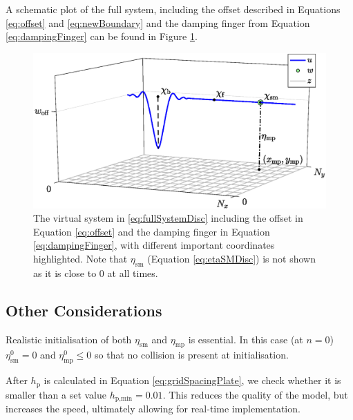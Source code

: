     A schematic plot of the full system, including the offset described in Equations \eqref{eq:offset} and \eqref{eq:newBoundary} and the damping finger from Equation \eqref{eq:dampingFinger} can be found in Figure \ref{fig:trombaSystem}.
    
    \begin{figure}[t]
      \centering
      \includegraphics[width=\paperFigWidth\textwidth]{figures/trombaSystem.eps}
      \caption{The virtual system in \eqref{eq:fullSystemDisc} including the offset in Equation \eqref{eq:offset} and the damping finger in Equation \eqref{eq:dampingFinger}, with different important coordinates highlighted. Note that $\eta_\text{sm}$ (Equation \eqref{eq:etaSMDisc}) is not shown as it is close to 0 at all times.}
      \label{fig:trombaSystem}
    \end{figure}
    
    
    \subsection{Other Considerations}
    Realistic initialisation of both $\eta_\text{sm}$ and $\eta_\text{mp}$ is essential. In this case (at $n=0$) $\eta_\text{sm}^0 = 0$ and $\eta_\text{mp}^0 \leq 0$ so that no collision is present at initialisation.%
    
    After $h_\text{p}$ is calculated in Equation \eqref{eq:gridSpacingPlate}, we check whether it is smaller than a set value $h_{\text{p},\text{min}} = 0.01$. This reduces the quality of the model, but increases the speed, ultimately allowing for real-time implementation.
    

